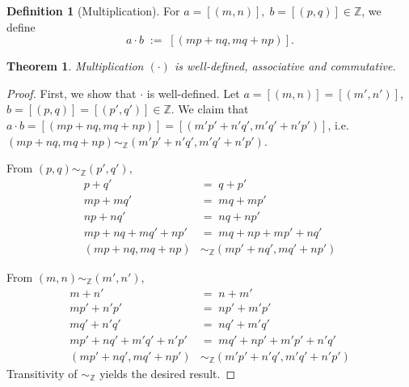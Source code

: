 \documentclass[10pt]{article}
\newtheorem{theorem}{Theorem}[section]
\theoremstyle{definition}
\newtheorem*{definition}{Definition}
\theoremstyle{remark}
\newcommand{\Z}{\mathbb{Z}}
\newcommand{\simZ}{\sim_{\Z}}
\begin{document}
        \begin{definition}[Multiplication]
        For $a = [(m, n)],\; b = [(p, q)] \in \Z$, we define
        \[
                a \cdot b \;:=\; [(mp + nq, mq + np)].
        \]
        \end{definition}
        \begin{theorem}
                Multiplication $(\cdot)$ is well-defined, associative and commutative.
        \end{theorem}
        \begin{proof}
                First, we show that $\cdot$ is well-defined.
                Let $a = [(m, n)] = [(m', n')]$, $b = [(p, q)] = [(p', q')] \in \Z$.
                We claim that $a\cdot b = [(mp + nq, mq + np)] = [(m'p' + n'q', m'q' + n'p')]$,
                i.e. $(mp + nq, mq + np) \simZ (m'p' + n'q', m'q' + n'p')$.

                From $(p, q) \simZ (p', q')$,
                \begin{align*}
                        p + q' \;&=\; q + p' \\
                        mp + mq' \;&=\; mq + mp' \\
                        np + nq' \;&=\; nq + np' \\
                        mp + nq + mq' + np' \;&=\; mq + np + mp' + nq' \\
                        (mp + nq, mq + np) &\simZ (mp' + nq', mq' + np')
                \end{align*}

                From $(m, n) \simZ (m', n')$,
                \begin{align*}
                        m + n' \;&=\; n + m' \\
                        mp' + n'p' \;&=\; np' + m'p' \\
                        mq' + n'q' \;&=\; nq' + m'q' \\
                        mp' + nq' + m'q' + n'p' \;&=\; mq' + np' + m'p' + n'q' \\
                        (mp' + nq', mq' + np') &\simZ (m'p' + n'q', m'q' + n'p')
                \end{align*}
                Transitivity of $\simZ$ yields the desired result.


\end{proof}
\end{document}
